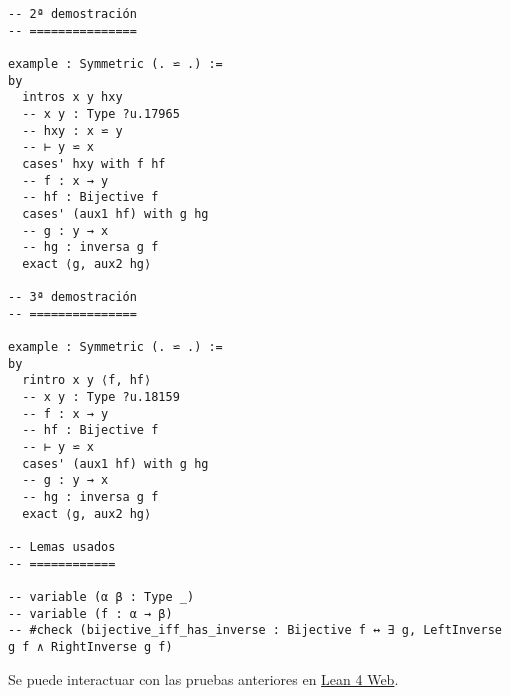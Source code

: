 \begin{verbatim}
-- 2ª demostración
-- ===============

example : Symmetric (. ⋍ .) :=
by
  intros x y hxy
  -- x y : Type ?u.17965
  -- hxy : x ⋍ y
  -- ⊢ y ⋍ x
  cases' hxy with f hf
  -- f : x → y
  -- hf : Bijective f
  cases' (aux1 hf) with g hg
  -- g : y → x
  -- hg : inversa g f
  exact ⟨g, aux2 hg⟩

-- 3ª demostración
-- ===============

example : Symmetric (. ⋍ .) :=
by
  rintro x y ⟨f, hf⟩
  -- x y : Type ?u.18159
  -- f : x → y
  -- hf : Bijective f
  -- ⊢ y ⋍ x
  cases' (aux1 hf) with g hg
  -- g : y → x
  -- hg : inversa g f
  exact ⟨g, aux2 hg⟩

-- Lemas usados
-- ============

-- variable (α β : Type _)
-- variable (f : α → β)
-- #check (bijective_iff_has_inverse : Bijective f ↔ ∃ g, LeftInverse g f ∧ RightInverse g f)
\end{verbatim}
Se puede interactuar con las pruebas anteriores en \href{https://lean.math.hhu.de/\#url=https://raw.githubusercontent.com/jaalonso/Calculemus2/main/src/La\_equipotencia\_es\_una\_relacion\_simetrica.lean}{Lean 4 Web}.

